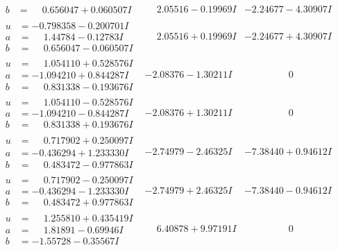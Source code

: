 \documentclass[1p]{elsarticle_modified}
\theoremstyle{definition}
\begin{document}
$$\begin{array}{c|c|c}
\begin{aligned}
b &= \phantom{-}0.656047 + 0.060507 I\end{aligned}
 & \phantom{-}2.05516 - 0.19969 I & -2.24677 - 4.30907 I \\ \hline\begin{aligned}
u &= -0.798358 - 0.200701 I \\
a &= \phantom{-}1.44784 - 0.12783 I \\
b &= \phantom{-}0.656047 - 0.060507 I\end{aligned}
 & \phantom{-}2.05516 + 0.19969 I & -2.24677 + 4.30907 I \\ \hline\begin{aligned}
u &= \phantom{-}1.054110 + 0.528576 I \\
a &= -1.094210 + 0.844287 I \\
b &= \phantom{-}0.831338 - 0.193676 I\end{aligned}
 & -2.08376 - 1.30211 I & \phantom{-0.000000 } 0 \\ \hline\begin{aligned}
u &= \phantom{-}1.054110 - 0.528576 I \\
a &= -1.094210 - 0.844287 I \\
b &= \phantom{-}0.831338 + 0.193676 I\end{aligned}
 & -2.08376 + 1.30211 I & \phantom{-0.000000 } 0 \\ \hline\begin{aligned}
u &= \phantom{-}0.717902 + 0.250097 I \\
a &= -0.436294 + 1.233330 I \\
b &= \phantom{-}0.483472 - 0.977863 I\end{aligned}
 & -2.74979 - 2.46325 I & -7.38440 + 0.94612 I \\ \hline\begin{aligned}
u &= \phantom{-}0.717902 - 0.250097 I \\
a &= -0.436294 - 1.233330 I \\
b &= \phantom{-}0.483472 + 0.977863 I\end{aligned}
 & -2.74979 + 2.46325 I & -7.38440 - 0.94612 I \\ \hline\begin{aligned}
u &= \phantom{-}1.255810 + 0.435419 I \\
a &= \phantom{-}1.81891 - 0.69946 I \\
b &= -1.55728 - 0.35567 I\end{aligned}
 & \phantom{-}6.40878 + 9.97191 I & \phantom{-0.000000 } 0 \\ \hline\begin{aligned}

\end{aligned}
\end{array}$$
\end{document}
